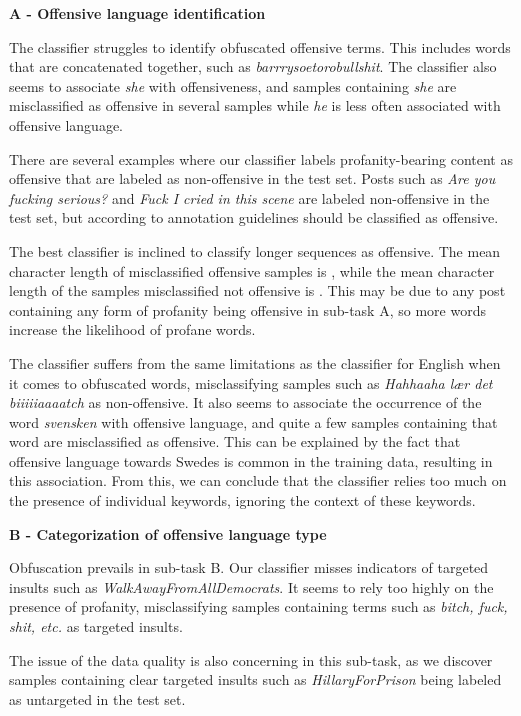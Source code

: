 \documentclass{article}
\begin{document}
\textbf{A - Offensive language identification}

The classifier struggles to identify obfuscated offensive terms. This includes words that are concatenated together, such as \textit{barrrysoetorobullshit}. The classifier also seems to associate \textit{she} with offensiveness, and samples containing \textit{she} are misclassified as offensive in several samples while \textit{he} is less often associated with offensive language. 

There are several examples where our classifier labels profanity-bearing content as offensive that are labeled as non-offensive in the test set. Posts such as \textit{Are you fucking serious?} and \textit{Fuck I cried in this scene} are labeled non-offensive in the test set, but according to annotation guidelines should  be classified as offensive. 

The best classifier is inclined to classify longer sequences as offensive. The mean character length of misclassified offensive samples is , while the mean character length of the samples misclassified not offensive is . This may be due to any post containing any form of profanity being offensive in sub-task A, so more words increase the likelihood of  profane words.

The classifier suffers from the same limitations as the classifier for English when it comes to obfuscated words, misclassifying samples such as \textit{Hahhaaha lær det biiiiiaaaatch} as non-offensive. It also seems to associate the occurrence of the word \textit{svensken} with offensive language, and quite a few samples containing that word are misclassified as offensive. This can be explained by the fact that offensive language towards Swedes is common in the training data, resulting in this association. From this, we can conclude that the classifier relies too much on the presence of individual keywords, ignoring  the context of these keywords. 

\textbf{B - Categorization of offensive language type}

Obfuscation prevails in sub-task B. Our classifier misses indicators of targeted insults such as \textit{WalkAwayFromAllDemocrats}. It seems to rely too highly on the presence of profanity, misclassifying samples containing terms such as \textit{bitch, fuck, shit, etc.} as targeted insults. 

The issue of the data quality is also concerning in this sub-task, as we discover samples containing clear targeted insults such as \textit{HillaryForPrison} being labeled as untargeted in the test set. 
\end{document}
